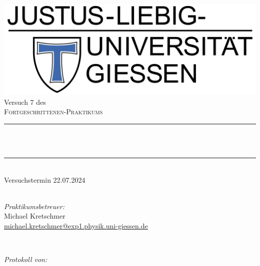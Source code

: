 \documentclass[12pt,a4paper,ngerman]{article}
\title{\mytitle} %
\author{Frederik Uhlemann, Florian Adamczyk}
\date{\today}
\makeatletter
\let\thetitle\@title
\makeatother
\begin{document}
		
	
	\begin{titlepage}
		\centering
		\vspace*{0.5 cm}
		\includegraphics[width = 0.6 \textwidth]{JLU_Giessen-Logo}	%
		\\[2.0 cm]
		Versuch 7 des\\
		\textsc{\Large Fortgeschrittenen-Praktikums}\\ [0.3 cm]				%
		\rule{\linewidth}{0.2 mm} \\[0.4 cm]
		{ \huge \bfseries \thetitle}\\
		\rule{\linewidth}{0.2 mm}\\
		Versuchstermin 22.07.2024 \\
		~ \\
		[2.0 cm]
		
		
		\begin{minipage}{0.49\textwidth}
			\begin{flushleft}
				 \emph{Praktikumsbetreuer:}\\
				 Michael Kretschmer\\
				 \small{\href{mailto:michael.kretschmer@exp1.physik.uni-giessen.de}{michael.kretschmer@exp1.physik.uni-giessen.de}}
			\end{flushleft}
		\end{minipage}~
		\begin{minipage}{0.49\textwidth}
			\begin{flushright}
				\emph{Protokoll von:} \\
				

\end{flushright}
\end{minipage}
\end{titlepage}
\end{document}
